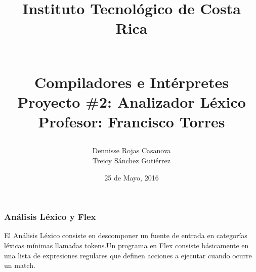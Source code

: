 \documentclass[10, usernames, dvipsnames]{beamer}
\begin{document}
 
\title{
\begin{LARGE}
Instituto Tecnol\'ogico de Costa Rica
\end{LARGE}
\newline
\begin{Large}
\\Compiladores e Int\'erpretes
\\Proyecto \#2: Analizador L\'exico
\\Profesor: Francisco Torres
\end{Large}
}
\author{Dennisse Rojas Casanova
\\Treicy S\'anchez Guti\'errez}
\date{25 de Mayo, 2016}
\maketitle 
\begin{frame} 
\frametitle{An\'alisis L\'exico y Flex} 
El An\'alisis L\'exico consiste en descomponer un fuente de entrada en categor\'ias l\'exicas m\'inimas llamadas tokens.Un programa en Flex consiste b\'asicamente en una lista de expresiones regulares que definen acciones a ejecutar cuando ocurre un match.\end{frame} 
\end{document}
